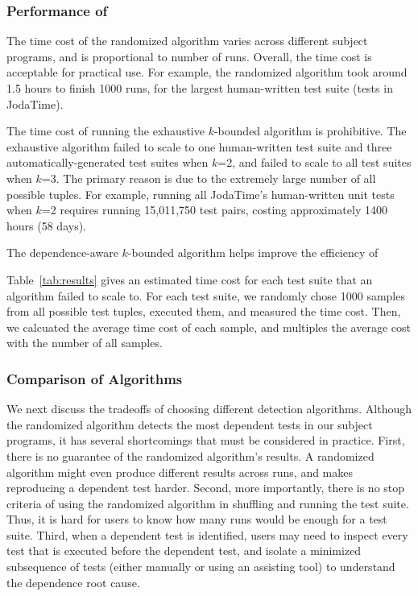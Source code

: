 \subsubsection{Performance of \ourtool}
\label{sec:performance}

The time cost of the randomized algorithm 
varies across different subject programs, and
is proportional to number of runs. Overall, the
time cost is acceptable for practical use.
For example, the randomized algorithm took around 1.5 hours
to finish 1000 runs,  for the largest human-written test
suite (\jodatimetests tests in JodaTime).
 
The time cost of running the exhaustive $k$-bounded algorithm
is prohibitive. The exhaustive algorithm failed to
scale to one human-written test suite and three automatically-generated
test suites when $k$=2, and failed to scale to all test suites
when $k$=3. The primary reason is due to the extremely large
number of all possible tuples. For example, running all JodaTime's \jodatimetests human-written
unit tests when $k$=2 requires running 15,011,750 test pairs, costing
approximately 1400 hours (58 days). 

The dependence-aware $k$-bounded algorithm helps improve
the efficiency of 

Table~\ref{tab:results} gives an estimated time cost for each
test suite that an algorithm failed to scale to. For each test suite,
we randomly chose 1000 samples from all possible
test tuples, executed them, and measured the time cost. Then,
we calcuated the average time cost of each sample, and multiples
the average cost with the number of all samples.



\subsubsection{Comparison of Algorithms}
\label{sec:algcomparison}

We next discuss the tradeoffs of choosing different detection
algorithms. Although the randomized algorithm
detects the most dependent tests in our subject programs,
it has several shortcomings that must be considered
in practice. First, there is no guarantee of
the randomized algorithm's results. A randomized
algorithm might even produce different results across runs,
and makes reproducing a dependent test harder.
Second, more importantly, there is no stop criteria
of using the randomized algorithm in shuffling and
running the test suite. Thus, it is hard for users
to know how many runs would be enough for a test suite.
Third, when a dependent test is identified, users
may need to inspect every test that is executed
before the dependent test, and isolate  a minimized
subsequence of tests (either
manually or using an assisting tool) to understand the dependence root cause.

